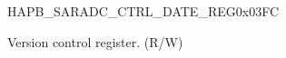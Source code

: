 \begin{register}{H}{APB\_SARADC\_CTRL\_DATE\_REG}{0x03FC}\label{regdesc:APBSARADCCTRLDATEREG}
%
\regnewline%
\begin{regdesc}\begin{reglist}
\label{fielddesc:APBSARADCDATE}\item [APB\_SARADC\_DATE] Version control register. (R/W)
\end{reglist}\end{regdesc}
\end{register}
